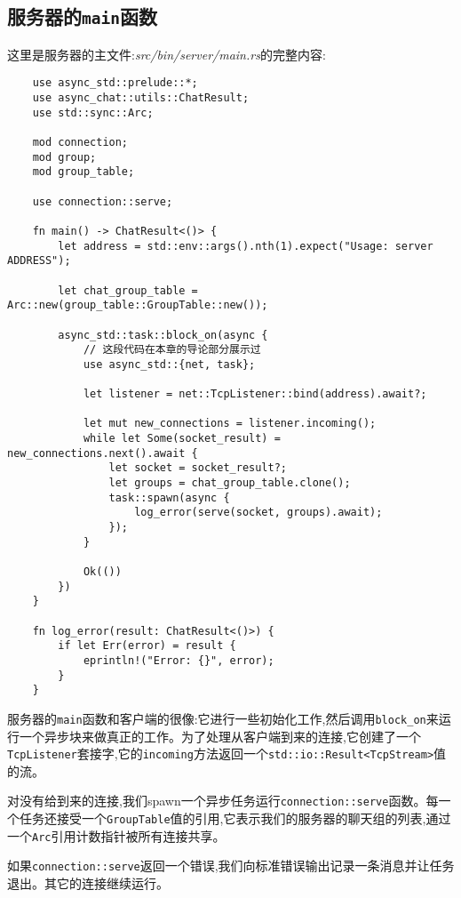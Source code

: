 \subsection{服务器的\texttt{main}函数}
这里是服务器的主文件:\emph{src/bin/server/main.rs}的完整内容:
\begin{verbatim}
    use async_std::prelude::*;
    use async_chat::utils::ChatResult;
    use std::sync::Arc;

    mod connection;
    mod group;
    mod group_table;

    use connection::serve;

    fn main() -> ChatResult<()> {
        let address = std::env::args().nth(1).expect("Usage: server ADDRESS");

        let chat_group_table = Arc::new(group_table::GroupTable::new());

        async_std::task::block_on(async {
            // 这段代码在本章的导论部分展示过
            use async_std::{net, task};
            
            let listener = net::TcpListener::bind(address).await?;

            let mut new_connections = listener.incoming();
            while let Some(socket_result) = new_connections.next().await {
                let socket = socket_result?;
                let groups = chat_group_table.clone();
                task::spawn(async {
                    log_error(serve(socket, groups).await);
                });
            }

            Ok(())
        })
    }

    fn log_error(result: ChatResult<()>) {
        if let Err(error) = result {
            eprintln!("Error: {}", error);
        }
    }
\end{verbatim}

服务器的\texttt{main}函数和客户端的很像:它进行一些初始化工作,然后调用\texttt{block\_on}来运行一个异步块来做真正的工作。为了处理从客户端到来的连接,它创建了一个\texttt{TcpListener}套接字,它的\texttt{incoming}方法返回一个\texttt{std::io::Result<TcpStream>}值的流。

对没有给到来的连接,我们spawn一个异步任务运行\texttt{connection::serve}函数。每一个任务还接受一个\texttt{GroupTable}值的引用,它表示我们的服务器的聊天组的列表,通过一个\texttt{Arc}引用计数指针被所有连接共享。

如果\texttt{connection::serve}返回一个错误,我们向标准错误输出记录一条消息并让任务退出。其它的连接继续运行。

